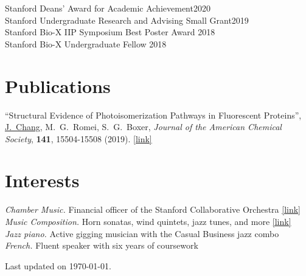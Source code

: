 \documentclass[margin,11pt]{res}
\begin{document}
\begin{resume}
Stanford Deans' Award for Academic Achievement\hfill 2020 \\
Stanford Undergraduate Research and Advising Small Grant\hfill 2019 \\
Stanford Bio-X IIP Symposium Best Poster Award \hfill 2018 \\
Stanford Bio-X Undergraduate Fellow \hfill 2018

\section{Publications}

% 

\begin{changemargin}{0em}{3em}
    ``Structural Evidence of Photoisomerization Pathways in Fluorescent Proteins'',
    \underline{J.\ Chang}, M.\ G.\ Romei, S.\ G.\ Boxer,
    \textit{Journal of the American Chemical Society},
    \textbf{141},
    15504-15508
    (2019).
    \href{http://dx.doi.org/10.1021/jacs.9b08356}{[link]}
\end{changemargin}

\section{Interests}

\textit{Chamber Music.} Financial officer of the Stanford Collaborative Orchestra \href{https://scor.stanford.edu}{[link]} \\
\textit{Music Composition.} Horn sonatas, wind quintets, jazz tunes, and more \href{https://stanford.edu/~jeffjar/music.html}{[link]} \\
\textit{Jazz piano.} Active gigging musician with the Casual Business jazz combo \\
\textit{French.} Fluent speaker with six years of coursework

\end{resume}

\vfill\hfill{\scriptsize Last updated on \today.}
\end{document}
